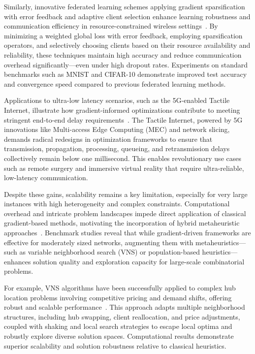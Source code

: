 \documentclass[sigconf]{acmart}
\begin{document}
Similarly, innovative federated learning schemes applying gradient sparsification with error feedback and adaptive client selection enhance learning robustness and communication efficiency in resource-constrained wireless settings~\cite{ref4}. By minimizing a weighted global loss with error feedback, employing sparsification operators, and selectively choosing clients based on their resource availability and reliability, these techniques maintain high accuracy and reduce communication overhead significantly—even under high dropout rates. Experiments on standard benchmarks such as MNIST and CIFAR-10 demonstrate improved test accuracy and convergence speed compared to previous federated learning methods.

Applications to ultra-low latency scenarios, such as the 5G-enabled Tactile Internet, illustrate how gradient-informed optimizations contribute to meeting stringent end-to-end delay requirements~\cite{ref10}. The Tactile Internet, powered by 5G innovations like Multi-access Edge Computing (MEC) and network slicing, demands radical redesigns in optimization frameworks to ensure that transmission, propagation, processing, queueing, and retransmission delays collectively remain below one millisecond. This enables revolutionary use cases such as remote surgery and immersive virtual reality that require ultra-reliable, low-latency communication.

Despite these gains, scalability remains a key limitation, especially for very large instances with high heterogeneity and complex constraints. Computational overhead and intricate problem landscapes impede direct application of classical gradient-based methods, motivating the incorporation of hybrid metaheuristic approaches~\cite{ref37}. Benchmark studies reveal that while gradient-driven frameworks are effective for moderately sized networks, augmenting them with metaheuristics—such as variable neighborhood search (VNS) or population-based heuristics—enhances solution quality and exploration capacity for large-scale combinatorial problems.

For example, VNS algorithms have been successfully applied to complex hub location problems involving competitive pricing and demand shifts, offering robust and scalable performance~\cite{ref37}. This approach adapts multiple neighborhood structures, including hub swapping, client reallocation, and price adjustments, coupled with shaking and local search strategies to escape local optima and robustly explore diverse solution spaces. Computational results demonstrate superior scalability and solution robustness relative to classical heuristics.
\end{document}
